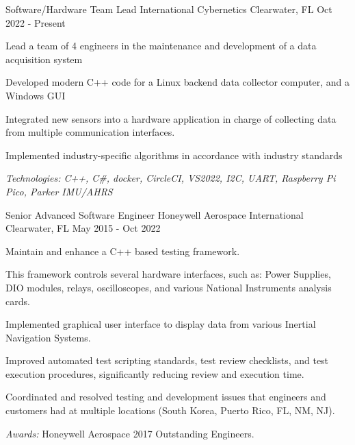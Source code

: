 

\begin{cventries}

  \cventry
    {Software/Hardware Team Lead} %
    {International Cybernetics} %
    {Clearwater, FL} %
    {Oct 2022 - Present} %
    {
      \begin{cvitems} %
        \item {Lead a team of 4 engineers in the maintenance and development of a data acquisition system}
        \item {Developed modern C++ code for a Linux backend data collector computer, and a Windows GUI}
        \item {Integrated new sensors into a hardware application in charge of collecting data from multiple communication interfaces.}
        \item {Implemented industry-specific algorithms in accordance with industry standards}
      \item {\it{Technologies:} C++, C\#, docker, CircleCI, VS2022, I2C, UART, Raspberry Pi Pico, Parker IMU/AHRS}
    \end{cvitems}
    }
  \cventry
    {Senior Advanced Software Engineer} %
    {Honeywell Aerospace International} %
    {Clearwater, FL} %
    {May 2015 - Oct 2022} %
    {
      \begin{cvitems} %
        \item {Maintain and enhance a C++ based testing framework.}
				\item {This framework controls several hardware interfaces, such as: Power Supplies, DIO modules, relays, oscilloscopes, and various National Instruments analysis cards.}
        \item {Implemented graphical user interface to display data from various Inertial Navigation Systems.}
				\item {Improved automated test scripting standards, test review checklists, and test execution procedures, significantly reducing review and execution time.}
        \item {Coordinated and resolved testing and development issues that engineers and customers had at multiple locations (South Korea, Puerto Rico, FL, NM, NJ).}
				\item {{\it Awards:} Honeywell Aerospace 2017 Outstanding Engineers.}
      \end{cvitems}
    }


\end{cventries}

